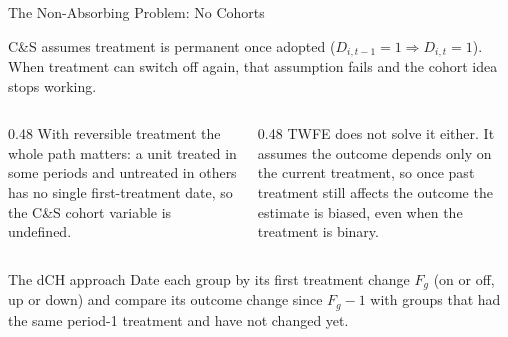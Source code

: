 \documentclass[main.tex]{subfiles}
\begin{document}
\begin{frame}{The Non-Absorbing Problem: No Cohorts}

  C\&S assumes treatment is permanent once adopted
  ($D_{i,t-1}=1 \Rightarrow D_{i,t}=1$). When treatment can switch off again,
  that assumption fails and the cohort idea stops working.

  \bigskip
  \begin{columns}[T]
    \begin{column}{0.48\textwidth}
      With reversible treatment the whole path matters: a unit treated in some
      periods and untreated in others has no single first-treatment date, so the
      C\&S cohort variable is undefined.
    \end{column}
    \begin{column}{0.48\textwidth}
      TWFE does not solve it either. It assumes the outcome depends only on the
      current treatment, so once past treatment still affects the outcome the
      estimate is biased, even when the treatment is binary.
    \end{column}
  \end{columns}

  \bigskip
  \begin{block}{The dCH approach}
    Date each group by its first treatment change $F_g$ (on or off, up or
    down) and compare its outcome change since $F_g-1$ with groups that had
    the same period-1 treatment and have not changed yet.
  \end{block}

\end{frame}
\end{document}
